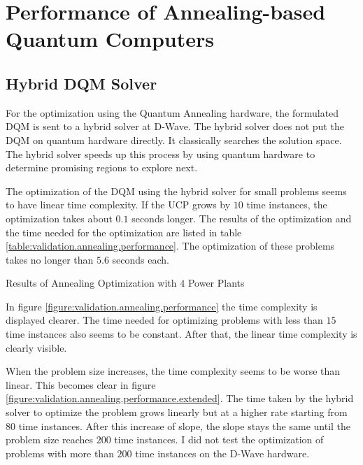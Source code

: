 \section{Performance of Annealing-based Quantum Computers}

\subsection{Hybrid DQM Solver}

For the optimization using the Quantum Annealing hardware, the formulated DQM is sent to a hybrid solver at D-Wave.
The hybrid solver does not put the DQM on quantum hardware directly.
It classically searches the solution space.
The hybrid solver speeds up this process by using quantum hardware to determine promising regions to explore next.
\cite{DQMHybrid2020}

The optimization of the DQM using the hybrid solver for small problems seems to have linear time complexity.
If the UCP grows by $10$ time instances, the optimization takes about $0.1$ seconds longer.
The results of the optimization and the time needed for the optimization are listed in table \ref{table:validation.annealing.performance}.
The optimization of these problems takes no longer than $5.6$ seconds each.

\begin{table}[ht]
  \centering
  
  \caption{Results of Annealing Optimization with $4$ Power Plants}
  \label{table:validation.annealing.performance}
\end{table}

In figure \ref{figure:validation.annealing.performance} the time complexity is displayed clearer.
The time needed for optimizing problems with less than $15$ time instances also seems to be constant.
After that, the linear time complexity is clearly visible.

When the problem size increases, the time complexity seems to be worse than linear.
This becomes clear in figure \ref{figure:validation.annealing.performance.extended}.
The time taken by the hybrid solver to optimize the problem grows linearly but at a higher rate starting from $80$ time instances.
After this increase of slope, the slope stays the same until the problem size reaches $200$ time instances.
I did not test the optimization of problems with more than $200$ time instances on the D-Wave hardware.

